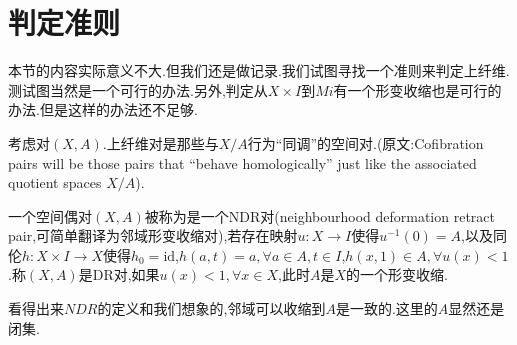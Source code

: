 \section{判定准则}
本节的内容实际意义不大.但我们还是做记录.我们试图寻找一个准则来判定上纤维.测试图当然是一个可行的办法.另外,判定从$X \times I$到$Mi$有一个形变收缩也是可行的办法.但是这样的办法还不足够.

考虑对$(X,A)$.上纤维对是那些与$X/A$行为“同调”的空间对.(原文:Cofibration pairs will be those pairs that “behave homologically” just like the associated
quotient spaces $X/A$).

\begin{definition}
    一个空间偶对$(X,A)$被称为是一个NDR对(neighbourhood deformation retract pair,可简单翻译为邻域形变收缩对),若存在映射$u:X \to I$使得$u^{-1}(0)=A$,以及同伦$h: X \times I \to X$使得$h_0=\mathrm{id}$,$h(a,t)=a,\forall a \in A,t \in I$,$h(x,1)\in A,\forall u(x)<1$.称$(X,A)$是DR对,如果$u(x)<1,\forall x \in X$,此时$A$是$X$的一个形变收缩.
\end{definition}
看得出来$NDR$的定义和我们想象的,邻域可以收缩到$A$是一致的.这里的$A$显然还是闭集.

